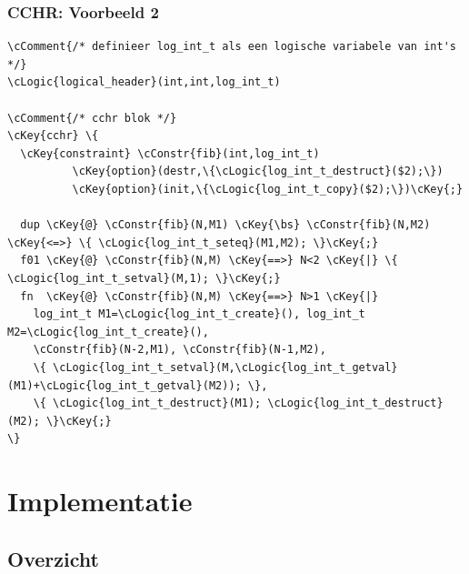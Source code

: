 \documentclass{beamer}
\newcommand{\bs}{$\backslash$}
\newcommand{\cConstr}[1]{\textcolor{blue}{#1}}
\newcommand{\cComment}[1]{\textcolor{dgreen}{#1}}
\newcommand{\cLogic}[1]{\textcolor{black}{#1}}
\newcommand{\cKey}[1]{\textcolor{red}{#1}}
\begin{document}
\begin{frame}[containsverbatim]
  \frametitle{CCHR: Voorbeeld 2}
  \begin{example}[Voorbeeld 2]{\scriptsize
\begin{Verbatim}[commandchars=\\\{\}]
\cComment{/* definieer log_int_t als een logische variabele van int's */}
\cLogic{logical_header}(int,int,log_int_t)

\cComment{/* cchr blok */}
\cKey{cchr} \{
  \cKey{constraint} \cConstr{fib}(int,log_int_t)
          \cKey{option}(destr,\{\cLogic{log_int_t_destruct}($2);\})
          \cKey{option}(init,\{\cLogic{log_int_t_copy}($2);\})\cKey{;}

  dup \cKey{@} \cConstr{fib}(N,M1) \cKey{\bs} \cConstr{fib}(N,M2) \cKey{<=>} \{ \cLogic{log_int_t_seteq}(M1,M2); \}\cKey{;}
  f01 \cKey{@} \cConstr{fib}(N,M) \cKey{==>} N<2 \cKey{|} \{ \cLogic{log_int_t_setval}(M,1); \}\cKey{;}
  fn  \cKey{@} \cConstr{fib}(N,M) \cKey{==>} N>1 \cKey{|}
    log_int_t M1=\cLogic{log_int_t_create}(), log_int_t M2=\cLogic{log_int_t_create}(),
    \cConstr{fib}(N-2,M1), \cConstr{fib}(N-1,M2),
    \{ \cLogic{log_int_t_setval}(M,\cLogic{log_int_t_getval}(M1)+\cLogic{log_int_t_getval}(M2)); \},
    \{ \cLogic{log_int_t_destruct}(M1); \cLogic{log_int_t_destruct}(M2); \}\cKey{;}
\}
\end{Verbatim}
}
  \end{example}
\end{frame}

\section{Implementatie}

\subsection{Overzicht}
\end{document}
